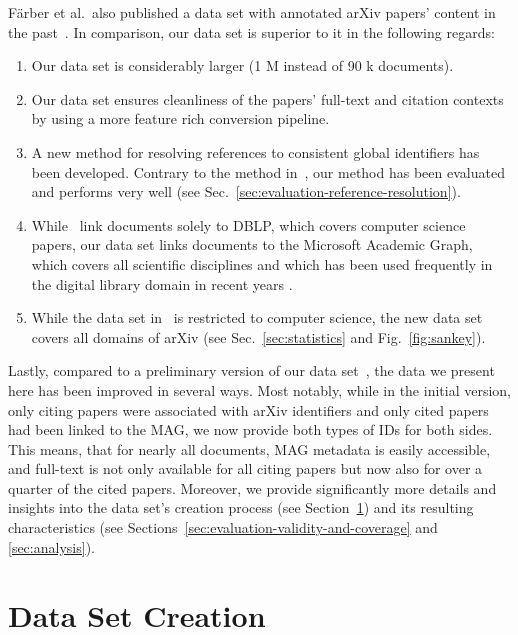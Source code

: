 F{\"{a}}rber et al.\ also published a data set with annotated arXiv papers' content in the past~\cite{Faerber2018LREC}. In comparison, our data set is superior to it in the following regards:
\begin{enumerate}
    \item Our data set is considerably larger (1 M instead of 90 k documents).
    \item Our data set ensures cleanliness of the papers' full-text and citation contexts by using a more feature rich conversion pipeline.
    \item A new method for resolving references to consistent global identifiers has been developed. Contrary to the method in~\cite{Faerber2018LREC}, our method has been evaluated and performs very well (see Sec.~\ref{sec:evaluation-reference-resolution}).
    \item While~\cite{Faerber2018LREC} link documents solely to DBLP, which covers computer science papers, our data set links documents to the Microsoft Academic Graph, which covers all scientific disciplines and which has been used frequently in the digital library domain in recent years \cite{Mohapatra2019}.
    \item While the data set in~\cite{Faerber2018LREC} is restricted to computer science, the new data set covers all domains of arXiv (see Sec.~\ref{sec:statistics} and Fig.~\ref{fig:sankey}).
\end{enumerate}

Lastly, compared to a preliminary version of our data set~\cite{Saier2019}, the data we present here has been improved in several ways. Most notably, while in the initial version, only citing papers were associated with arXiv identifiers and only cited papers had been linked to the MAG, we now provide both types of IDs for both sides. This means, that for nearly all documents, MAG metadata is easily accessible, and full-text is not only available for all citing papers but now also for over a quarter of the cited papers. Moreover, we provide significantly more details and insights into the data set's creation process (see Section~\ref{sec:data-set-creation}) and its resulting characteristics (see Sections~\ref{sec:evaluation-validity-and-coverage} and \ref{sec:analysis}).



\section{Data Set Creation}
\label{sec:data-set-creation}

